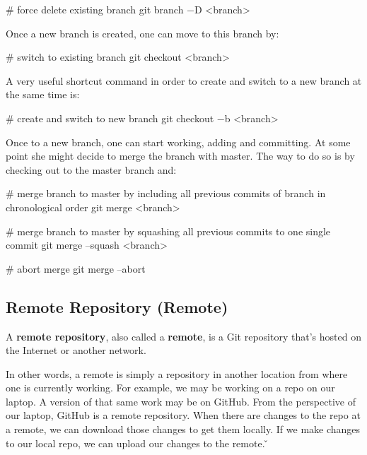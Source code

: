 \begin{bash}
# force delete existing branch
git branch $-$D <branch>
\end{bash}

Once a new branch is created, one can move to this branch by:

\begin{bash}
# switch to existing branch
git checkout <branch>
\end{bash}

A very useful shortcut command in order to create and switch to a new branch at the same time is:

\begin{bash}
# create and switch to new branch
git checkout $-$b <branch>
\end{bash}

Once to a new branch, one can start working, adding and committing. At some point she might decide to merge the
branch with master. The way to do so is by checking out to the master branch and:

\begin{bash}
# merge branch to master by including all previous commits of branch in chronological order
git merge <branch>
\end{bash}

\begin{bash}
# merge branch to master by squashing all previous commits to one single commit
git merge --squash <branch>
\end{bash}

\begin{bash}
# abort merge
git merge --abort
\end{bash}

\subsection{Remote Repository (Remote)}

A \textbf{remote repository}, also called a \textbf{remote}, is a Git repository that's hosted on the Internet or
another network.
\ed

In other words, a remote is simply a repository in another location from where one is currently working. For example,
we may be working on a repo on our laptop. A version of that same work may be on GitHub. From the perspective of our
laptop, GitHub is a remote repository. When there are changes to the repo at a remote, we can download those changes
to get them locally. If we make changes to our local repo, we can upload our changes to the remote. \v


